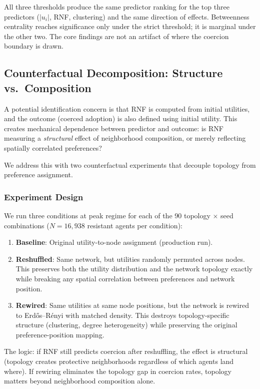 \documentclass[11pt, a4paper]{article}
\begin{document}
All three thresholds produce the same predictor ranking for the top three predictors ($|u_i|$, RNF, clustering) and the same direction of effects. Betweenness centrality reaches significance only under the strict threshold; it is marginal under the other two. The core findings are not an artifact of where the coercion boundary is drawn.

\subsection{Counterfactual Decomposition: Structure vs.\ Composition}
\label{sec:counterfactual}

A potential identification concern is that RNF is computed from initial utilities, and the outcome (coerced adoption) is also defined using initial utility. This creates mechanical dependence between predictor and outcome: is RNF measuring a \textit{structural} effect of neighborhood composition, or merely reflecting spatially correlated preferences?

We address this with two counterfactual experiments that decouple topology from preference assignment.

\subsubsection{Experiment Design}

We run three conditions at peak regime for each of the 90 topology $\times$ seed combinations ($N = 16{,}938$ resistant agents per condition):

\begin{enumerate}
\item \textbf{Baseline}: Original utility-to-node assignment (production run).
\item \textbf{Reshuffled}: Same network, but utilities randomly permuted across nodes. This preserves both the utility distribution and the network topology exactly while breaking any spatial correlation between preferences and network position.
\item \textbf{Rewired}: Same utilities at same node positions, but the network is rewired to Erd\H{o}s--R\'{e}nyi with matched density. This destroys topology-specific structure (clustering, degree heterogeneity) while preserving the original preference-position mapping.
\end{enumerate}

The logic: if RNF still predicts coercion after reshuffling, the effect is structural (topology creates protective neighborhoods regardless of which agents land where). If rewiring eliminates the topology gap in coercion rates, topology matters beyond neighborhood composition alone.
\end{document}
